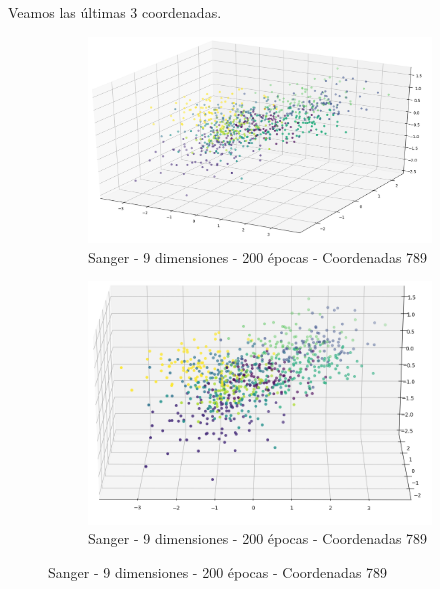 Veamos las últimas 3 coordenadas.


\begin{figure}[!htbp]
\centering
\begin{subfigure}{.5\textwidth}
  \centering
  \includegraphics[width=1\linewidth, scale=1]{../img/ej1/sanger_corrida_200_9/sanger_9salida_200ep_testing_dim789.png}
  \caption{Sanger - 9 dimensiones - 200 épocas - Coordenadas 789}
  \label{fig:sub1}
\end{subfigure}%
\begin{subfigure}{.5\textwidth}
  \centering
  \includegraphics[width=1\linewidth, scale=1]{../img/ej1/sanger_corrida_200_9/sanger_9salida_200ep_testing_dim789_2.png}
  \caption{Sanger - 9 dimensiones - 200 épocas - Coordenadas 789}
  \label{fig:sub2}
\end{subfigure}
\end{figure}

